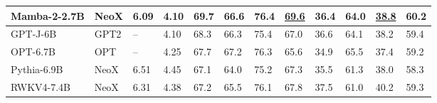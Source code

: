 \begin{table*}[ht]
{\begin{tabular}{@{}llllllllllll@{}}
      \textbf{Mamba-2-2.7B} & NeoX        & \textbf{6.09}              & \textbf{4.10}              & \textbf{69.7}             & \textbf{66.6}              & \textbf{76.4}             & \underline{69.6}          & \textbf{36.4}                         & \textbf{64.0}                           & \underline{38.8}                        & \textbf{60.2} \\
      \midrule
      GPT-J-6B              & GPT2        & --                         & 4.10                       & 68.3                      & 66.3                       & 75.4                      & 67.0                      & 36.6                                  & 64.1                                    & 38.2                                    & 59.4 \\
      OPT-6.7B              & OPT         & --                         & 4.25                       & 67.7                      & 67.2                       & 76.3                      & 65.6                      & 34.9                                  & 65.5                                    & 37.4                                    & 59.2 \\
      Pythia-6.9B           & NeoX        & 6.51                       & 4.45                       & 67.1                      & 64.0                       & 75.2                      & 67.3                      & 35.5                                  & 61.3                                    & 38.0                                    & 58.3 \\
      RWKV4-7.4B            & NeoX        & 6.31                       & 4.38                       & 67.2                      & 65.5                       & 76.1                      & 67.8                      & 37.5                                  & 61.0                                    & 40.2                                    & 59.3 \\
      \bottomrule
    \end{tabular}
  }
  \label{table:downstream_zeroshot_full}
\end{table*}

